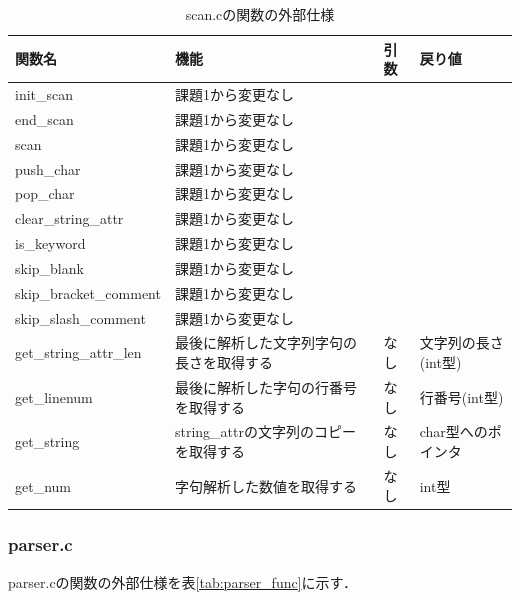 \documentclass{jlreq}
\begin{document}
\begin{table}[H]
  \centering
  \caption{scan.cの関数の外部仕様}
  \begin{tabular}{|l|p{6cm}|l|p{3cm}|}
    \hline
    関数名                 & 機能                                     & 引数 & 戻り値              \\ \hline
    init\_scan             & 課題1から変更なし                        & ~    & ~                   \\
    end\_scan              & 課題1から変更なし                        & ~    & ~                   \\
    scan                   & 課題1から変更なし                        & ~    & ~                   \\
    push\_char             & 課題1から変更なし                        & ~    & ~                   \\
    pop\_char              & 課題1から変更なし                        & ~    & ~                   \\
    clear\_string\_attr    & 課題1から変更なし                        & ~    & ~                   \\
    is\_keyword            & 課題1から変更なし                        & ~    & ~                   \\
    skip\_blank            & 課題1から変更なし                        & ~    & ~                   \\
    skip\_bracket\_comment & 課題1から変更なし                        & ~    & ~                   \\
    skip\_slash\_comment   & 課題1から変更なし                        & ~    & ~                   \\
    get\_string\_attr\_len & 最後に解析した文字列字句の長さを取得する & なし & 文字列の長さ(int型) \\
    get\_linenum           & 最後に解析した字句の行番号を取得する     & なし & 行番号(int型)       \\
    get\_string            & string\_attrの文字列のコピーを取得する   & なし & char型へのポインタ  \\
    get\_num               & 字句解析した数値を取得する               & なし & int型               \\ \hline
  \end{tabular}
  \label{tab:scan_func}
\end{table}

\subsubsection{parser.c}
parser.cの関数の外部仕様を表\ref{tab:parser_func}に示す．
\end{document}
